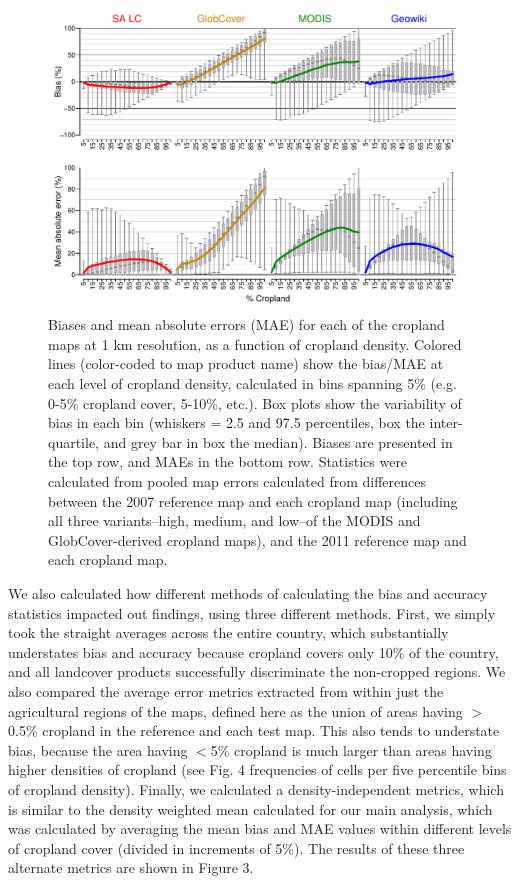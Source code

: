 \documentclass[11pt, titlepage]{article}
\begin{document}
\begin{figure}[!ht]
  \centering
     \includegraphics[width = 14cm]{figures/biases_1km.pdf} 
      \caption{Biases and mean absolute errors (MAE) for each of the cropland maps at 1 km resolution, as a function of cropland density. Colored lines (color-coded to map product name) show the bias/MAE at each level of cropland density, calculated in bins spanning 5\% (e.g. 0-5\% cropland cover, 5-10\%, etc.). Box plots show the variability of bias in each bin (whiskers = 2.5 and 97.5 percentiles, box the inter-quartile, and grey bar in box the median). Biases are presented in the top row, and MAEs in the bottom row. Statistics were calculated from pooled map errors calculated from differences between the 2007 reference map and each cropland map (including all three variants--high, medium, and low--of the MODIS and GlobCover-derived cropland maps), and the 2011 reference map and each cropland map. }
      \label{fig:default}
\end{figure}

We also calculated how different methods of calculating the bias and accuracy statistics impacted out findings, using three different methods. First, we simply took the straight averages across the entire country, which substantially understates bias and accuracy because cropland covers only 10\% of the country, and all landcover products successfully discriminate the non-cropped regions.  We also compared the average error metrics extracted from within just the agricultural regions of the maps, defined here as the union of areas having $>$0.5\% cropland in the reference and each test map. This also tends to understate bias, because the area having $<$5\% cropland is much larger than areas having higher densities of cropland (see Fig. 4 frequencies of cells per five percentile bins of cropland density). Finally, we calculated a density-independent metrics, which is similar to the density weighted mean calculated for our main analysis, which was calculated by averaging the mean bias and MAE values within different levels of cropland cover (divided in increments of 5\%). The results of these three alternate metrics are shown in Figure 3. 
\end{document}
